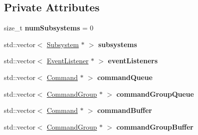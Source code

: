 \subsection*{Private Attributes}
\begin{DoxyCompactItemize}
\item 
\mbox{\label{classlib_iterative_robot_1_1_event_scheduler_a54fd5203a21eb54497840e03ec179f30}} 
size\+\_\+t {\bfseries num\+Subsystems} = 0
\item 
\mbox{\label{classlib_iterative_robot_1_1_event_scheduler_a37e13e6049f502dbadbc0c81345ff206}} 
std\+::vector$<$ \mbox{\hyperlink{classlib_iterative_robot_1_1_subsystem}{Subsystem}} $\ast$ $>$ {\bfseries subsystems}
\item 
\mbox{\label{classlib_iterative_robot_1_1_event_scheduler_abc088d35399b0b1eaa20d573acbdd21e}} 
std\+::vector$<$ \mbox{\hyperlink{classlib_iterative_robot_1_1_event_listener}{Event\+Listener}} $\ast$ $>$ {\bfseries event\+Listeners}
\item 
\mbox{\label{classlib_iterative_robot_1_1_event_scheduler_a24710c3528945cb3ed1e9ae61267b570}} 
std\+::vector$<$ \mbox{\hyperlink{classlib_iterative_robot_1_1_command}{Command}} $\ast$ $>$ {\bfseries command\+Queue}
\item 
\mbox{\label{classlib_iterative_robot_1_1_event_scheduler_a355d50b2ab9edbb9295cd0a540422be6}} 
std\+::vector$<$ \mbox{\hyperlink{classlib_iterative_robot_1_1_command_group}{Command\+Group}} $\ast$ $>$ {\bfseries command\+Group\+Queue}
\item 
\mbox{\label{classlib_iterative_robot_1_1_event_scheduler_a1ddae49a738b69e0e73b4b529a585226}} 
std\+::vector$<$ \mbox{\hyperlink{classlib_iterative_robot_1_1_command}{Command}} $\ast$ $>$ {\bfseries command\+Buffer}
\item 
\mbox{\label{classlib_iterative_robot_1_1_event_scheduler_a37b0c1d9ec0c00e7729bec67ebbd9986}} 
std\+::vector$<$ \mbox{\hyperlink{classlib_iterative_robot_1_1_command_group}{Command\+Group}} $\ast$ $>$ {\bfseries command\+Group\+Buffer}

\end{DoxyCompactItemize}
